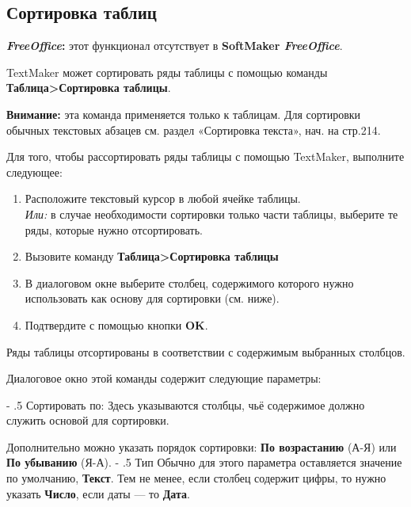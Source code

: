 \documentclass[a4paper,10pt]{article}
\makeatletter
\renewcommand\paragraph{%
   \@startsection{paragraph}{4}{0mm}%
      {-\baselineskip}%
      {.5\baselineskip}%
      {\normalfont\normalsize\bfseries}}
\makeatother
\begin{document}
\subsection{Сортировка таблиц}
\begin{mdframed}[backgroundcolor=pink!50]
\textbf{\textit{FreeOffice}:} этот функционал отсутствует в \textbf{SoftMaker \textit{FreeOffice}}.
\end{mdframed}
TextMaker может сортировать ряды таблицы с помощью команды \textbf{Таблица>Сортировка таблицы}.

\begin{mdframed}[backgroundcolor=blue!10]
\textbf{Внимание:} эта команда применяется только к таблицам. Для сортировки обычных текстовых абзацев см. раздел «Сортировка текста», нач. на стр.214.
\end{mdframed}

Для того, чтобы рассортировать ряды таблицы с помощью TextMaker, выполните следующее:
\begin{enumerate}
 \item Расположите текстовый курсор в любой ячейке таблицы.\\
 \textit{Или:} в случае необходимости сортировки только части таблицы, выберите те ряды, которые нужно отсортировать.
 \item Вызовите команду \textbf{Таблица>Сортировка таблицы}
 \item В диалоговом окне выберите столбец, содержимого которого нужно использовать как основу для сортировки (см. ниже).
 \item Подтвердите с помощью кнопки \textbf{OK}.
\end{enumerate}

Ряды таблицы отсортированы в соответствии с содержимым выбранных столбцов.

Диалоговое окно этой команды содержит следующие параметры:

\paragraph{Сортировать по:}
Здесь указываются столбцы, чьё содержимое должно служить основой для сортировки.

Дополнительно можно указать порядок сортировки: \textbf{По возрастанию} (А-Я) или \textbf{По убыванию} (Я-А).
\paragraph{Тип}
Обычно для этого параметра оставляется значение по умолчанию, \textbf{Текст}. Тем не менее, если столбец содержит цифры, то нужно указать \textbf{Число}, если даты --- то \textbf{Дата}.
\end{document}

